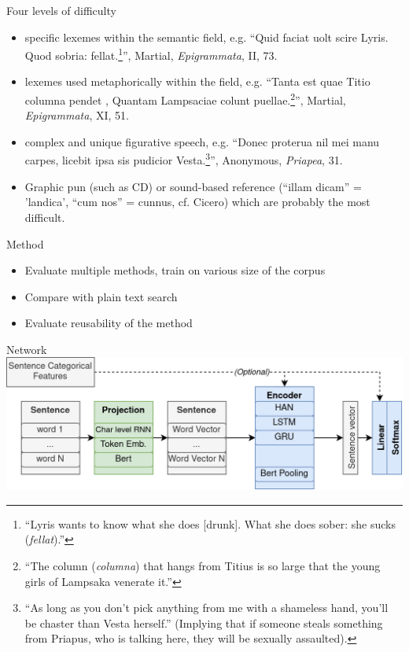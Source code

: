 \documentclass[aspectratio=169]{beamer}
\begin{document}
\begin{frame}{Four levels of difficulty}
   \begin{itemize}
        \item specific lexemes within the semantic field, e.g. ``Quid faciat uolt scire Lyris. Quod sobria: fellat.\footnote{``Lyris wants to know what she does [drunk]. What she does sober: she sucks (\textit{fellat}).''}'', Martial, \textit{Epigrammata}, II, 73. 
        \item lexemes used metaphorically within the field, e.g. ``Tanta est quae Titio columna pendet , Quantam Lampsaciae colunt puellae.\footnote{``The column (\textit{columna}) that hangs from Titius is so large that the young girls of Lampsaka venerate it.''}'', Martial, \textit{Epigrammata}, XI, 51.
        \item complex and unique figurative speech, e.g. ``Donec proterua nil mei manu carpes, licebit ipsa sis pudicior Vesta.\footnote{``As long as you don't pick anything from me with a shameless hand, you'll be chaster than Vesta herself.'' (Implying that if someone steals something from Priapus, who is talking here, they will be sexually assaulted).}'',  Anonymous, \textit{Priapea}, 31.
        \item Graphic pun (such as CD) or sound-based reference (``illam dicam'' = 'landica', ``cum nos'' = cunnus, cf. Cicero) which are probably the most difficult.
    \end{itemize}
\end{frame}

\begin{frame}{Method}
    \begin{itemize}
        \item Evaluate multiple methods, train on various size of the corpus
        \item Compare with plain text search
        \item Evaluate reusability of the method
    \end{itemize}
\end{frame}

\begin{frame}{Network}
    \includegraphics[width=\linewidth]{nlp-for-ch/images/layers.png}
\end{frame}
\end{document}
